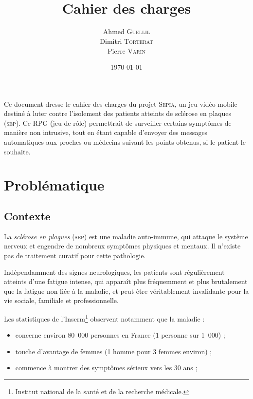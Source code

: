\documentclass[a4paper,12pt,francais]{article}
\title{\Sepia\\Cahier des charges}
\author{
    Ahmed \textsc{Guellil}\\
    Dimitri \textsc{Torterat}\\
    Pierre \textsc{Varin}
}
\date{\today} %
\newcommand{\SEP}{\textsc{sep}\xspace}
\newcommand{\Sepia}{\textsc{Sepia}\xspace}
\begin{document}
\renewcommand{\contentsname}{Sommaire}

\maketitle

Ce document dresse le cahier des charges du projet \Sepia, un jeu vidéo mobile destiné à luter contre l’isolement des patients atteints de sclérose en plaques (\SEP). Ce RPG (jeu de rôle) permettrait de surveiller certains symptômes de manière non intrusive, tout en étant capable d’envoyer des messages automatiques aux proches ou médecins suivant les points obtenus, si le patient le souhaite.


\newpage
\tableofcontents
\newpage

\section{Problématique}
\subsection{Contexte}

La \emph{sclérose en plaques} (\textsc{sep}) est une maladie auto-immune, qui attaque le système nerveux et engendre de nombreux symptômes physiques et mentaux. Il n’existe pas de traitement curatif pour cette pathologie.

Indépendamment des signes neurologiques, les patients sont régulièrement atteints d’une fatigue intense, qui apparaît plus fréquemment et plus brutalement que la fatigue non liée à la maladie, et peut être véritablement invalidante pour la vie sociale, familiale et professionnelle.

Les statistiques de l’Inserm\footnote{Institut national de la santé et de la recherche médicale.} observent notamment que la maladie :
\begin{itemize}
\item concerne environ 80~000 personnes en France (1 personne sur 1~000) ;
\item touche d’avantage de femmes (1 homme pour 3 femmes environ) ;
\item commence à montrer des symptômes sérieux vers les 30 ans ;
\end{itemize}
\end{document}
